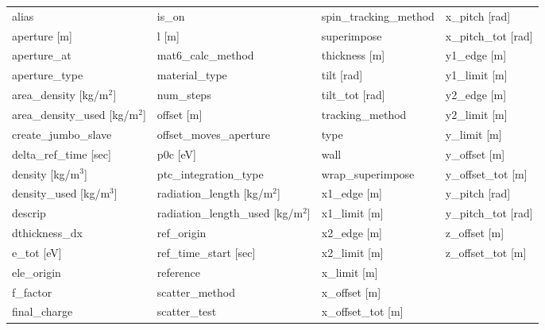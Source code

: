  \begin{tabular}{llll} \toprule
alias                            & is_on                            & spin_tracking_method             & x_pitch [rad]                    \\
aperture [m]                     & l [m]                            & superimpose                      & x_pitch_tot [rad]                \\
aperture_at                      & mat6_calc_method                 & thickness [m]                    & y1_edge [m]                      \\
aperture_type                    & material_type                    & tilt [rad]                       & y1_limit [m]                     \\
area_density [kg/m$^2$]          & num_steps                        & tilt_tot [rad]                   & y2_edge [m]                      \\
area_density_used [kg/m$^2$]     & offset [m]                       & tracking_method                  & y2_limit [m]                     \\
create_jumbo_slave               & offset_moves_aperture            & type                             & y_limit [m]                      \\
delta_ref_time [sec]             & p0c [eV]                         & wall                             & y_offset [m]                     \\
density [kg/m$^3$]               & ptc_integration_type             & wrap_superimpose                 & y_offset_tot [m]                 \\
density_used [kg/m$^3$]          & radiation_length [kg/m$^2$]      & x1_edge [m]                      & y_pitch [rad]                    \\
descrip                          & radiation_length_used [kg/m$^2$] & x1_limit [m]                     & y_pitch_tot [rad]                \\
dthickness_dx                    & ref_origin                       & x2_edge [m]                      & z_offset [m]                     \\
e_tot [eV]                       & ref_time_start [sec]             & x2_limit [m]                     & z_offset_tot [m]                 \\
ele_origin                       & reference                        & x_limit [m]                      &                                  \\
f_factor                         & scatter_method                   & x_offset [m]                     &                                  \\
final_charge                     & scatter_test                     & x_offset_tot [m]                 &                                  \\
 \bottomrule
 \end{tabular}
 \vfill
 
